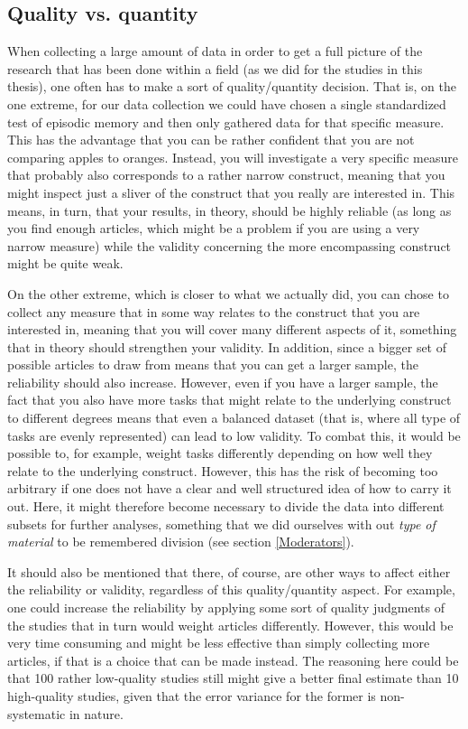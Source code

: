 \subsection{Quality vs. quantity}

When collecting a large amount of data in order to get a full picture of the research that has been done within a field (as we did for the studies in this thesis), one often has to make a sort of quality/quantity decision. That is, on the one extreme, for our data collection we could have chosen a single standardized test of episodic memory and then only gathered data for that specific measure. This has the advantage that you can be rather confident that you are not comparing apples to oranges. Instead, you will investigate a very specific measure that probably also corresponds to a rather narrow construct, meaning that you might inspect just a sliver of the construct that you really are interested in. This means, in turn, that your results, in theory, should be highly reliable (as long as you find enough articles, which might be a problem if you are using a very narrow measure) while the validity concerning the more encompassing construct might be quite weak.

On the other extreme, which is closer to what we actually did, you can chose to collect any measure that in some way relates to the construct that you are interested in, meaning that you will cover many different aspects of it, something that in theory should strengthen your validity. In addition, since a bigger set of possible articles to draw from means that you can get a larger sample, the reliability should also increase.  However, even if you have a larger sample, the fact that you also have more tasks that might relate to the underlying construct to different degrees means that even a balanced dataset (that is, where all type of tasks are evenly represented) can lead to low validity. To combat this, it would be possible to, for example, weight tasks differently depending on how well they relate to the underlying construct. However, this has the risk of becoming too arbitrary if one does not have a clear and well structured idea of how to carry it out. Here, it might therefore become necessary to divide the data into different subsets for further analyses, something that we did ourselves with out \emph{type of material} to be remembered division (see section \ref{Moderators}).

It should also be mentioned that there, of course, are other ways to affect either the reliability or validity, regardless of this quality/quantity aspect. For example, one could increase the reliability by applying some sort of quality judgments of the studies that in turn would weight articles differently. However, this would be very time consuming and might be less effective than simply collecting more articles, if that is a choice that can be made instead. The reasoning here could be that 100 rather low-quality studies still might give a better final estimate than 10 high-quality studies, given that the error variance for the former is non-systematic in nature.

